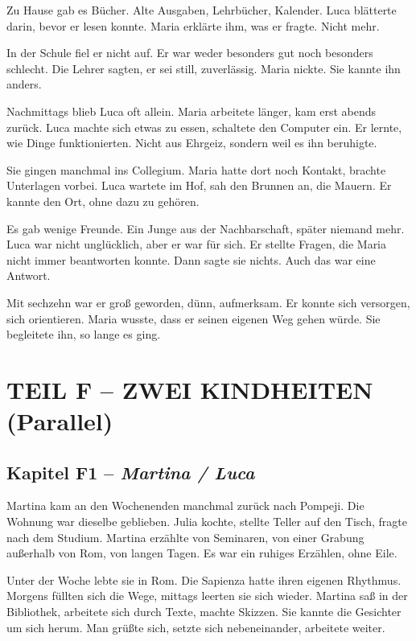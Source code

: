 \documentclass[
]{article}
\begin{document}
Zu Hause gab es Bücher. Alte Ausgaben, Lehrbücher, Kalender. Luca blätterte darin, bevor er lesen konnte. Maria erklärte ihm, was er fragte. Nicht mehr.

In der Schule fiel er nicht auf. Er war weder besonders gut noch besonders schlecht. Die Lehrer sagten, er sei still, zuverlässig. Maria nickte. Sie kannte ihn anders.

Nachmittags blieb Luca oft allein. Maria arbeitete länger, kam erst abends zurück. Luca machte sich etwas zu essen, schaltete den Computer ein. Er lernte, wie Dinge funktionierten. Nicht aus Ehrgeiz, sondern weil es ihn beruhigte.

Sie gingen manchmal ins Collegium. Maria hatte dort noch Kontakt, brachte Unterlagen vorbei. Luca wartete im Hof, sah den Brunnen an, die Mauern. Er kannte den Ort, ohne dazu zu gehören.

Es gab wenige Freunde. Ein Junge aus der Nachbarschaft, später niemand mehr. Luca war nicht unglücklich, aber er war für sich. Er stellte Fragen, die Maria nicht immer beantworten konnte. Dann sagte sie nichts. Auch das war eine Antwort.

Mit sechzehn war er groß geworden, dünn, aufmerksam. Er konnte sich versorgen, sich orientieren. Maria wusste, dass er seinen eigenen Weg gehen würde. Sie begleitete ihn, so lange es ging.

\section{TEIL F -- ZWEI KINDHEITEN (Parallel)}\label{teil-f-zwei-kindheiten-parallel}

\subsection{\texorpdfstring{Kapitel F1 -- \emph{Martina / Luca}}{Kapitel F1 -- Martina / Luca}}\label{kapitel-f1-martina-luca}

Martina kam an den Wochenenden manchmal zurück nach Pompeji. Die Wohnung war dieselbe geblieben. Julia kochte, stellte Teller auf den Tisch, fragte nach dem Studium. Martina erzählte von Seminaren, von einer Grabung außerhalb von Rom, von langen Tagen. Es war ein ruhiges Erzählen, ohne Eile.

Unter der Woche lebte sie in Rom. Die Sapienza hatte ihren eigenen Rhythmus. Morgens füllten sich die Wege, mittags leerten sie sich wieder. Martina saß in der Bibliothek, arbeitete sich durch Texte, machte Skizzen. Sie kannte die Gesichter um sich herum. Man grüßte sich, setzte sich nebeneinander, arbeitete weiter.
\end{document}
